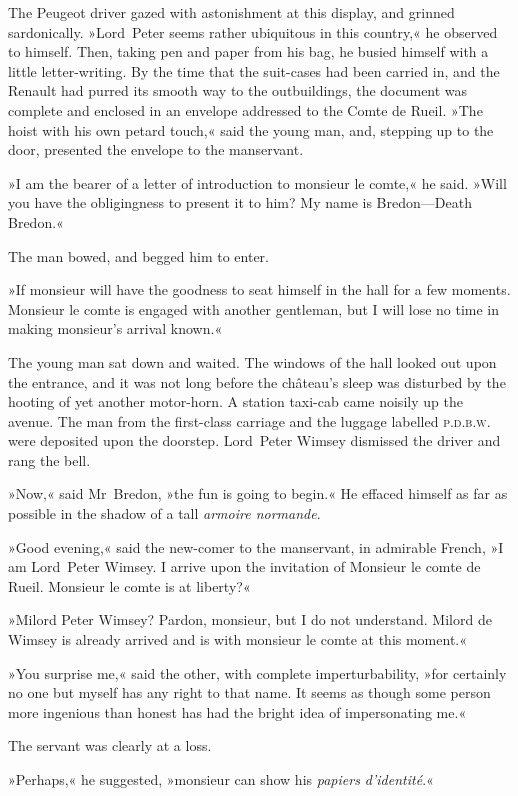 The Peugeot driver gazed with astonishment at this display, and grinned sardonically. »Lord~Peter seems rather ubiquitous in this country,« he observed to himself. Then, taking pen and paper from his bag, he busied himself with a little letter-writing. By the time that the suit-cases had been carried in, and the Renault had purred its smooth way to the outbuildings, the document was complete and enclosed in an envelope addressed to the Comte de Rueil. »The hoist with his own petard touch,« said the young man, and, stepping up to the door, presented the envelope to the manservant.

»I am the bearer of a letter of introduction to monsieur le comte,« he said. »Will you have the obligingness to present it to him? My name is Bredon—Death Bredon.«

The man bowed, and begged him to enter.

»If monsieur will have the goodness to seat himself in the hall for a few moments. Monsieur le comte is engaged with another gentleman, but I will lose no time in making monsieur's arrival known.«

The young man sat down and waited. The windows of the hall looked out upon the entrance, and it was not long before the château's sleep was disturbed by the hooting of yet another motor-horn. A station taxi-cab came noisily up the avenue. The man from the first-class carriage and the luggage labelled \textsc{p.d.b.w.} were deposited upon the doorstep. Lord~Peter Wimsey dismissed the driver and rang the bell.

»Now,« said Mr~Bredon, »the fun is going to begin.« He effaced himself as far as possible in the shadow of a tall \textit{armoire normande}.

»Good evening,« said the new-comer to the manservant, in admirable French, »I am Lord~Peter Wimsey. I arrive upon the invitation of Monsieur le comte de Rueil. Monsieur le comte is at liberty?«

»Milord Peter Wimsey? Pardon, monsieur, but I do not understand. Milord de Wimsey is already arrived and is with monsieur le comte at this moment.«

»You surprise me,« said the other, with complete imperturbability, »for certainly no one but myself has any right to that name. It seems as though some person more ingenious than honest has had the bright idea of impersonating me.«

The servant was clearly at a loss.

»Perhaps,« he suggested, »monsieur can show his \textit{papiers d'identité}.«


